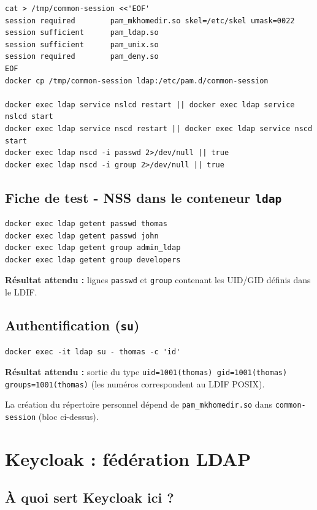 \documentclass[11pt,a4paper]{report}
\begin{document}
\begin{lstlisting}[style=bashstyle]
cat > /tmp/common-session <<'EOF'
session required        pam_mkhomedir.so skel=/etc/skel umask=0022
session sufficient      pam_ldap.so
session sufficient      pam_unix.so
session required        pam_deny.so
EOF
docker cp /tmp/common-session ldap:/etc/pam.d/common-session

docker exec ldap service nslcd restart || docker exec ldap service nslcd start
docker exec ldap service nscd restart || docker exec ldap service nscd start
docker exec ldap nscd -i passwd 2>/dev/null || true
docker exec ldap nscd -i group 2>/dev/null || true
\end{lstlisting}

\section{Fiche de test - NSS dans le conteneur \texttt{ldap}}

\begin{lstlisting}[style=bashstyle]
docker exec ldap getent passwd thomas
docker exec ldap getent passwd john
docker exec ldap getent group admin_ldap
docker exec ldap getent group developers
\end{lstlisting}

\textbf{Résultat attendu :} lignes \texttt{passwd} et \texttt{group} contenant les UID/GID définis dans le LDIF.

\section{Authentification (\texttt{su})}

\begin{lstlisting}[style=bashstyle]
docker exec -it ldap su - thomas -c 'id'
\end{lstlisting}

\textbf{Résultat attendu :} sortie du type \texttt{uid=1001(thomas) gid=1001(thomas) groups=1001(thomas)} (les numéros correspondent au LDIF POSIX).

La création du répertoire personnel dépend de \texttt{pam\_mkhomedir.so} dans \texttt{common-session} (bloc ci-dessus).

\chapter{Keycloak : fédération LDAP}

\section{À quoi sert Keycloak ici ?}
\end{document}
